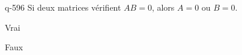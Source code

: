 \begin{truefalse}{q-596}
Si deux matrices vérifient $AB=0$, alors $A=0$ ou $B=0$.
\item Vrai
\item* Faux
\end{truefalse}

